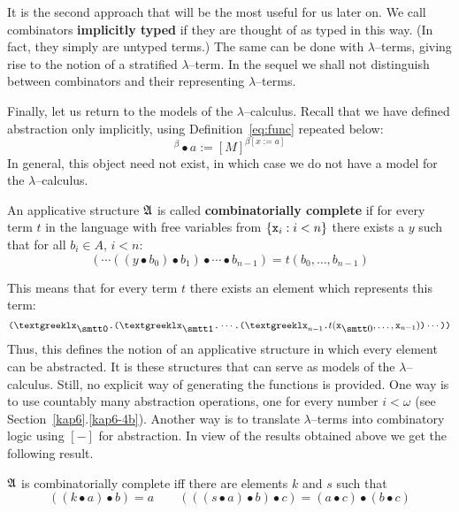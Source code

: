 It is the second approach that will be the most useful for us
later on. We call combinators \textbf{implicitly typed} if they
are thought of as typed in this way. (In fact, they simply
are untyped terms.) The same can be done with $\lambda$--terms,
giving rise to the notion of a stratified $\lambda$--term. In
the sequel we shall not distinguish between combinators and their
representing $\lambda$--terms.

Finally, let us return to the models of the $\lambda$--calculus.
Recall that we have defined abstraction only implicitly, using
Definition~\eqref{eq:func} repeated below:
\begin{equation}
[\mbox{\tt (\stlambda} x.M\mbox{\tt )}]^{\beta} \bullet a 
    := [M]^{\beta[x := a]}
\end{equation}
In general, this object need not exist, in which case we do not have 
a model for the $\lambda$--calculus. 
\begin{defn}
An applicative structure $\mathfrak{A}$ is called \textbf{combinatorially
complete} if for every term $t$ in the language with free
variables from $\{\mbox{\tt x}_i : i < n\}$
there exists a $y$ such that for all $b_i \in A$, $i < n$:
\begin{equation}
(\dotsb ((y \bullet b_0) \bullet b_1) \bullet
\dotsb \bullet b_{n-1}) = t(b_0, \dotsc, b_{n-1})
\end{equation}
\end{defn}
This means that for every term $t$ there exists an element
which represents this term: 
\begin{equation}
\mbox{\tt ({\stlambda}x$_{\snull}$.({\stlambda}x$_{\seins}$.}%
\dotsb\mbox{\tt .({\stlambda}x}_{n-1}\mbox{\tt .}t(\mbox{\tt x}_{\snull},
    \dotsc, \mbox{\tt x}_{n-1})\mbox{\tt )}\dotsb
    \mbox{\tt ))} 
\end{equation}
Thus, this defines the notion of an applicative structure in which 
every element can be abstracted. It is these structures that can 
serve as models of the $\lambda$--calculus. Still, no explicit way 
of generating the functions is provided. One way is to use countably 
many abstraction operations, one for every number $i < \omega$
(see Section~\ref{kap6}.\ref{kap6-4b}). Another way is to translate 
$\lambda$--terms into combinatory logic using $[-]$ for abstraction.
In view of the results obtained above we get the following result.
\begin{thm}
$\mathfrak{A}$ is combinatorially complete iff there are elements
$k$ and $s$ such that
\begin{equation}
((k \bullet a) \bullet b) = a \qquad
(((s \bullet a) \bullet b) \bullet c) =
(a \bullet c) \bullet (b \bullet c)
\end{equation}
\end{thm}
